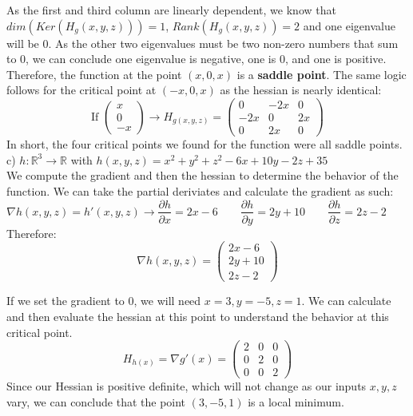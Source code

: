 \documentclass[12pt,twoside]{article}
\newcommand{\R}{\mathbb{R}}
\begin{document}
As the first and third column are linearly dependent, we know that $dim(Ker(H_g(x,y,z)))=1$, $Rank(H_g(x,y,z))=2$ and one eigenvalue will be 0. As the other two eigenvalues must be two non-zero numbers that sum to 0, we can conclude one eigenvalue is negative, one is 0, and one is positive. Therefore, the function at the point $(x,0,x)$ is a \textbf{saddle point}. The same logic follows for the critical point at $(-x,0,x)$ as the hessian is nearly identical:
$$
    \text{If } \begin{pmatrix} x \\ 0 \\ -x \end{pmatrix} \rightarrow 
    H_{g(x,y,z)} = \begin{pmatrix}
    0 & -2x & 0 \\
    -2x & 0 & 2x \\
    0 & 2x & 0
    \end{pmatrix}
$$
In short, the four critical points we found for the function were all saddle points.\\


c) $h: \R^3 \to \R$ with $h(x,y,z) = x^2 + y^2 + z^2 - 6x + 10y - 2z + 35$ \\
We compute the gradient and then the hessian to determine the behavior of the function. We can take the partial deriviates and calculate the gradient as such:
$$
         \nabla h(x,y,z) = h'(x,y,z) \rightarrow \frac{\partial h}{\partial x} = 2x-6
         \qquad \frac{\partial h}{\partial y} = 2y+10
         \qquad \frac{\partial h}{\partial z} = 2z-2
         \qquad 
$$
Therefore:
$$ \nabla h(x,y,z) = 
    \begin{pmatrix} 
    2x-6 \\
    2y + 10 \\
    2z-2
    \end{pmatrix}
$$

If we set the gradient to 0, we will need $x=3, y=-5, z=1$. We can calculate and then evaluate the hessian at this point to understand the behavior at this critical point.
$$
    H_{h(x)} = \nabla g'(x) = \begin{pmatrix}
    2 & 0 & 0 \\
    0 & 2 & 0 \\
    0 & 0 & 2
    \end{pmatrix}
    $$
Since our Hessian is positive definite, which will not change as our inputs $x,y,z$ vary, we can conclude that the point $(3,-5,1)$ is a local minimum. 

\newpage 
\end{document}
